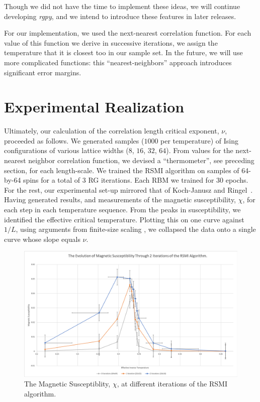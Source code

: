 Though we did not have the time to implement these ideas, we will
continue developing \textit{rgpy}, and we intend to introduce these
features in later releases.

For our implementation, we used the next-nearest correlation function.
For each value of this function we derive in successive iterations, we
assign the temperature that it is closest too in our sample set. In the future,
we will use more complicated functions: this ``nearest-neighbors'' approach
introduces significant error margins.

\section{Experimental Realization}\label{sec:methods}
Ultimately, our calculation of the correlation length critical
exponent, $\nu$, proceeded as follows. We generated samples ($1000$
per temperature) of Ising configurations of various lattice widths
($8$, $16$, $32$, $64$). From values for the next-nearest neighbor
correlation function, we devised a ``thermometer'', see preceding
section, for each length-scale. We trained the RSMI algorithm on
samples of 64-by-64 spins for a total of 3 RG iterations. Each RBM we
trained for 30 epochs. For the rest, our experimental set-up mirrored
that of Koch-Janusz and Ringel~\cite{kjr}. Having generated results,
and measurements of the magnetic susceptibility, $\chi$, for each step
in each temperature sequence.  From the peaks in susceptibility, we
identified the effective critical temperature.  Plotting this on one
curve against $1 / L$, using arguments from finite-size scaling , we
collapsed the data onto a single curve whose slope equals $\nu$.
\begin{figure}[ht]
  \centering
  \includegraphics[width=\textwidth]{figures/susceptibility.png}
  \caption{The Magnetic Susceptiblity, $\chi$, at different iterations
    of the RSMI algorithm.\label{fig:susceptibility} }
\end{figure}

